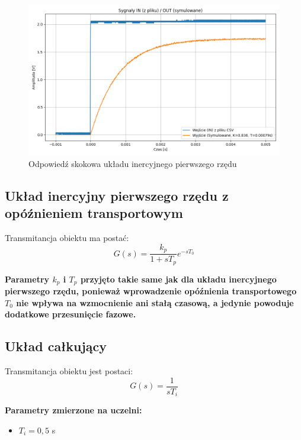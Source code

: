 \documentclass[12pt,a4paper]{article}
\begin{document}
	\begin{figure}[H]
		\centering
		\includegraphics[width=1\linewidth]{zdjecia/OdpSkokowa1.png}
		\caption{Odpowiedź skokowa układu inercyjnego pierwszego rzędu}
		\label{fig:OdpSkokowa1}
	\end{figure}
	
	\subsection{Układ inercyjny pierwszego rzędu z opóźnieniem transportowym}
	
	Transmitancja obiektu ma postać:
	\begin{equation}
		G(s) = \frac{k_p}{1 + sT_p} e^{-sT_0}
	\end{equation}
		
	\noindent \textbf{Parametry $k_p$ i $T_p$ przyjęto takie same jak dla układu inercyjnego pierwszego rzędu, 
		ponieważ wprowadzenie opóźnienia transportowego $T_0$ nie wpływa na wzmocnienie ani stałą czasową, a jedynie powoduje dodatkowe przesunięcie fazowe.}
	
	\subsection{Układ całkujący}
	Transmitancja obiektu jest postaci:
	\begin{equation}
		G(s) = \frac{1}{sT_i}
	\end{equation}
	
	\noindent \textbf{Parametry zmierzone na uczelni:}
	\begin{itemize}
		\item $T_i = 0{,}5$ s %
	\end{itemize}
	
\end{document}
